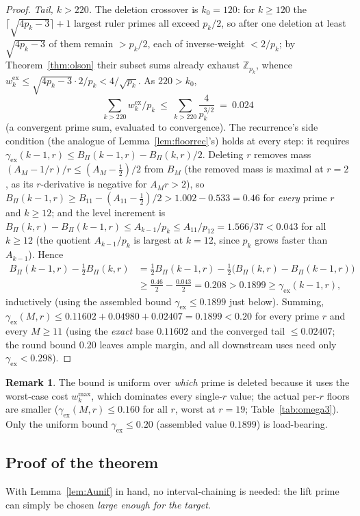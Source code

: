 \documentclass[11pt]{amsart}
\theoremstyle{plain}
\theoremstyle{definition}
\newtheorem{remark}[theorem]{Remark}
\newcommand{\Z}{\mathbb{Z}}
\begin{document}
\begin{proof}
\emph{Tail, $k>220$.}  The deletion crossover is $k_0=120$: for $k\ge120$ the
$\lceil\sqrt{4p_k-3}\rceil+1$ largest ruler primes all exceed $p_k/2$, so after one
deletion at least $\sqrt{4p_k-3}$ of them remain $>p_k/2$, each of inverse-weight
$<2/p_k$; by Theorem~\ref{thm:olson} their subset sums already exhaust
$\Z_{p_k}$, whence $w_k^{\mathrm{ex}}\le\sqrt{4p_k-3}\cdot2/p_k<4/\sqrt{p_k}$.  As
$220>k_0$,
\[
  \sum_{k>220}w_k^{\mathrm{ex}}/p_k\ \le\ \sum_{k>220}\frac{4}{p_k^{3/2}}\ =\ 0.024
\]
(a convergent prime sum, evaluated to convergence).  The recurrence's side
condition (the analogue of Lemma~\ref{lem:floorrec}'s) holds at every step: it
requires $\gamma_{\mathrm{ex}}(k-1,r)\le B_\Pi(k-1,r)-B_\Pi(k,r)/2$.  Deleting $r$
removes mass $(A_M-1/r)/r\le(A_M-\tfrac12)/2$ from $B_M$ (the removed mass is
maximal at $r=2$, as its $r$-derivative is negative for $A_M r>2$), so
$B_\Pi(k-1,r)\ge B_{11}-(A_{11}-\tfrac12)/2>1.002-0.533=0.46$ for \emph{every}
prime $r$ and $k\ge12$; and the level increment is
$B_\Pi(k,r)-B_\Pi(k-1,r)\le A_{k-1}/p_k\le A_{11}/p_{12}=1.566/37<0.043$ for all
$k\ge12$ (the quotient $A_{k-1}/p_k$ is largest at $k=12$, since $p_k$ grows
faster than $A_{k-1}$).  Hence
\[
\begin{aligned}
  B_\Pi(k-1,r)-\tfrac12B_\Pi(k,r)
  &=\tfrac12B_\Pi(k-1,r)-\tfrac12\bigl(B_\Pi(k,r)-B_\Pi(k-1,r)\bigr)\\
  &\ge\tfrac{0.46}2-\tfrac{0.043}2=0.208>0.1899\ge\gamma_{\mathrm{ex}}(k-1,r),
\end{aligned}
\]
inductively (using the assembled bound $\gamma_{\mathrm{ex}}\le0.1899$ just below).
Summing,
$\gamma_{\mathrm{ex}}(M,r)\le0.11602+0.04980+0.02407=0.1899<0.20$ for every prime
$r$ and every $M\ge11$ (using the \emph{exact} base $0.11602$ and the converged
tail $\le0.02407$; the round bound $0.20$ leaves ample margin, and all downstream
uses need only $\gamma_{\mathrm{ex}}<0.298$).
\end{proof}

\begin{remark}
The bound is uniform over \emph{which} prime is deleted because it uses the
worst-case cost $w_k^{\max}$, which dominates every single-$r$ value; the actual
per-$r$ floors are smaller ($\gamma_{\mathrm{ex}}(M,r)\le0.160$ for all $r$, worst
at $r=19$; Table~\ref{tab:omega3}).  Only the uniform bound
$\gamma_{\mathrm{ex}}\le0.20$ (assembled value $0.1899$) is load-bearing.
\end{remark}

\subsection{Proof of the theorem}
With Lemma~\ref{lem:Aunif} in hand, no interval-chaining is needed: the lift prime
can simply be chosen \emph{large enough for the target}.
\end{document}

